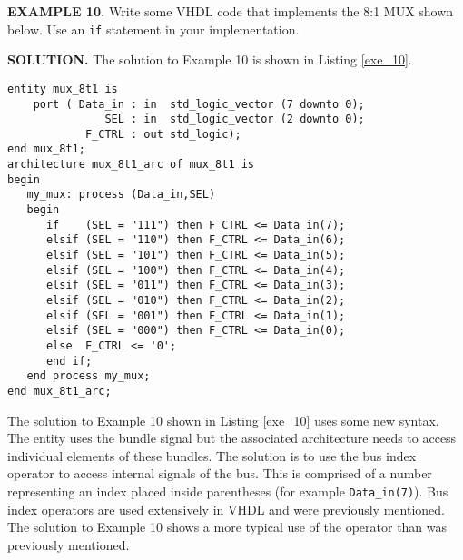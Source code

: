 \begin{leftbar}
\noindent
\begin{minipage}{0.45\linewidth}
\textbf{EXAMPLE 10.}
Write some VHDL code that implements the 8:1 MUX shown below. Use an \texttt{if} statement in your implementation.\\
\end{minipage}
\begin{minipage}{0.5\linewidth}
\begin{flushright}
\end{flushright}
\end{minipage}

\end{leftbar}
\noindent
\textbf{SOLUTION.} The solution to Example 10 is shown in Listing \ref{exe_10}.
\begin{lstlisting}[label=exe_10, caption=Solution to Example 10.]
entity mux_8t1 is
    port ( Data_in : in  std_logic_vector (7 downto 0);
               SEL : in  std_logic_vector (2 downto 0);
            F_CTRL : out std_logic);  
end mux_8t1;
architecture mux_8t1_arc of mux_8t1 is 
begin
   my_mux: process (Data_in,SEL)
   begin
      if    (SEL = "111") then F_CTRL <= Data_in(7); 
      elsif (SEL = "110") then F_CTRL <= Data_in(6); 
      elsif (SEL = "101") then F_CTRL <= Data_in(5); 
      elsif (SEL = "100") then F_CTRL <= Data_in(4); 
      elsif (SEL = "011") then F_CTRL <= Data_in(3); 
      elsif (SEL = "010") then F_CTRL <= Data_in(2); 
      elsif (SEL = "001") then F_CTRL <= Data_in(1); 
      elsif (SEL = "000") then F_CTRL <= Data_in(0); 
      else  F_CTRL <= '0'; 
      end if;    
   end process my_mux; 
end mux_8t1_arc; 
\end{lstlisting}
The solution to Example 10 shown in Listing \ref{exe_10} uses some new syntax. The entity uses the bundle signal but the associated architecture needs to access individual elements of these bundles. The solution is to use the bus index operator to access internal signals of the bus. This is comprised of a number representing an index placed inside parentheses (for example \texttt{Data\_in(7)}). Bus index operators are used extensively in VHDL and were previously mentioned. The solution to Example 10 shows a more typical use of the operator than was previously mentioned.

